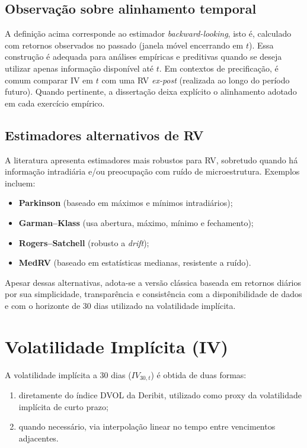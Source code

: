 \subsection{Observação sobre alinhamento temporal}

A definição acima corresponde ao estimador \textit{backward-looking}, isto é,
calculado com retornos observados no passado (janela móvel encerrando em $t$).
Essa construção é adequada para análises empíricas e preditivas quando se deseja
utilizar apenas informação disponível até $t$. Em contextos de precificação, é
comum comparar IV em $t$ com uma RV \textit{ex-post} (realizada ao longo do
período futuro). Quando pertinente, a dissertação deixa explícito o alinhamento
adotado em cada exercício empírico.

\subsection{Estimadores alternativos de RV}

A literatura apresenta estimadores mais robustos para RV, sobretudo quando há
informação intradiária e/ou preocupação com ruído de microestrutura. Exemplos incluem:
\begin{itemize}
    \item \textbf{Parkinson} (baseado em máximos e mínimos intradiários);
    \item \textbf{Garman--Klass} (usa abertura, máximo, mínimo e fechamento);
    \item \textbf{Rogers--Satchell} (robusto a \textit{drift});
    \item \textbf{MedRV} (baseado em estatísticas medianas, resistente a ruído).
\end{itemize}

Apesar dessas alternativas, adota-se a versão clássica baseada em retornos diários
por sua simplicidade, transparência e consistência com a disponibilidade de dados
e com o horizonte de 30 dias utilizado na volatilidade implícita.

\section{Volatilidade Implícita (IV)}

A volatilidade implícita a 30 dias ($IV_{30,t}$) é obtida de duas formas:

\begin{enumerate}
    \item diretamente do índice DVOL da Deribit, utilizado como proxy da volatilidade
    implícita de curto prazo;
    \item quando necessário, via interpolação linear no tempo entre vencimentos adjacentes.
\end{enumerate}

